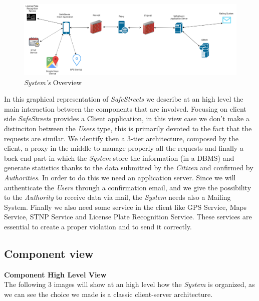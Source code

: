 \documentclass{article}
\begin{document}
\begin{figure}[H]
    \centering
    \includegraphics[scale=0.3]{img/overview.png}
    \caption{\textit{System's} Overview}
\end{figure}

In this graphical representation of \textit{SafeStreets} we describe at an high level the main interaction
between the components that are involved. Focusing on client side \textit{SafeStreets} provides a Client 
application, in this view case we don't make a distinciton between the \textit{Users} type, this is 
primarily devoted to the fact that the requests are similar. We identify then a 3-tier architecture, 
composed by the client, a proxy in the middle to manage properly all the requests and finally a back 
end part in which the \textit{System} store the information (in a DBMS) and generate statistics thanks
to the data submitted by the \textit{Citizen} and confirmed by \textit{Authorities}. In order to do this
we need an application server. Since we will authenticate the \textit{Users} through a confirmation email, 
and we give the possibility to the \textit{Authority} to receive data via mail, the \textit{System} needs
also a Mailing System. Finally we also need some service in the client like GPS Service, Maps Service,
STNP Service and License Plate Recognition Service. These services are essential to create a proper violation
and to send it correctly.

\clearpage
\subsection{Component view}
\textbf{Component High Level View} \\
The following 3 images will show at an high level how the \textit{System} is organized, as we can see the
choice we made is a classic client-server architecture. 
\end{document}
